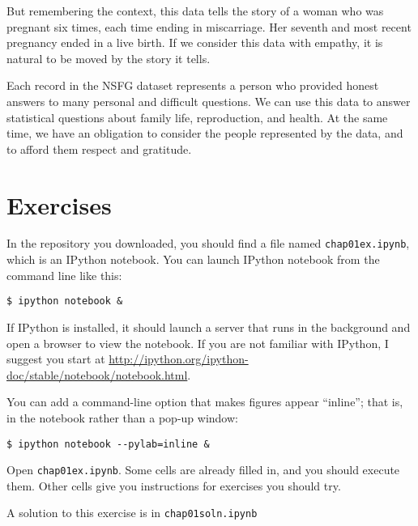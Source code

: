But remembering the context, this data tells the story of a woman who
was pregnant six times, each time ending in miscarriage.  Her seventh
and most recent pregnancy ended in a live birth.  If we consider this
data with empathy, it is natural to be moved by the story it tells.

Each record in the NSFG dataset represents a person who provided
honest answers to many personal and difficult questions.  We can use
this data to answer statistical questions about family life,
reproduction, and health.  At the same time, we have an obligation
to consider the people represented by the data, and to afford them
respect and gratitude.


\section{Exercises}

\begin{exercise}
In the repository you downloaded, you should find a file named
\verb"chap01ex.ipynb", which is an IPython notebook.  You can
launch IPython notebook from the command line like this:

\begin{verbatim}
$ ipython notebook &
\end{verbatim}

If IPython is installed, it should launch a server that runs in the
background and open a browser to view the notebook.  If you are not
familiar with IPython, I suggest you start at
\url{http://ipython.org/ipython-doc/stable/notebook/notebook.html}.

You can add a command-line option that makes figures appear ``inline'';
that is, in the notebook rather than a pop-up window:

\begin{verbatim}
$ ipython notebook --pylab=inline &
\end{verbatim}

Open \verb"chap01ex.ipynb".  Some cells are already filled in, and
you should execute them.  Other cells give you instructions for
exercises you should try.

A solution to this exercise is in \verb"chap01soln.ipynb"
\end{exercise}


